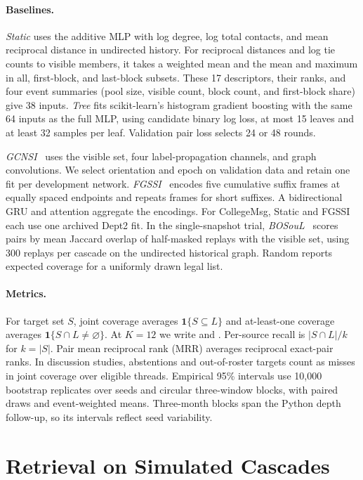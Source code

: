 \paragraph{Baselines.}
\emph{Static} uses the additive MLP with log degree, log total contacts, and mean reciprocal distance in undirected history. For reciprocal distances and log tie counts to visible members, it takes a weighted mean and the mean and maximum in all, first-block, and last-block subsets. These 17 descriptors, their ranks, and four event summaries (pool size, visible count, block count, and first-block share) give 38 inputs. \emph{Tree} fits scikit-learn's histogram gradient boosting with the same 64 inputs as the full MLP, using candidate binary log loss, at most 15 leaves and at least 32 samples per leaf. Validation pair loss selects 24 or 48 rounds.

\emph{GCNSI}~\cite{gcnsi} uses the visible set, four label-propagation channels, and graph convolutions. We select orientation and epoch on validation data and retain one fit per development network. \emph{FGSSI}~\cite{fgssi} encodes five cumulative suffix frames at equally spaced endpoints and repeats frames for short suffixes. A bidirectional GRU and attention aggregate the encodings. For CollegeMsg, Static and FGSSI each use one archived Dept2 fit. In the single-snapshot trial, \emph{BOSouL}~\cite{bosoul} scores pairs by mean Jaccard overlap of half-masked replays with the visible set, using 300 replays per cascade on the undirected historical graph. Random reports expected coverage for a uniformly drawn legal list.

\paragraph{Metrics.}
For target set $S$, joint coverage averages $\mathbf{1}\{S\subseteq L\}$ and at-least-one coverage averages \mbox{$\mathbf{1}\{S\cap L\ne\varnothing\}$}. At $K=12$ we write \both{} and \anytwelve{}. Per-source recall is $|S\cap L|/k$ for $k=|S|$. Pair mean reciprocal rank (MRR) averages reciprocal exact-pair ranks. In discussion studies, abstentions and out-of-roster targets count as misses in joint coverage over eligible threads. Empirical 95\% intervals use 10,000 bootstrap replicates over seeds and circular three-window blocks, with paired draws and event-weighted means. Three-month blocks span the Python depth follow-up, so its intervals reflect seed variability.

\section{Retrieval on Simulated Cascades}
